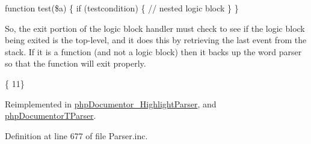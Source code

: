 {\ttfamily  function test(\$a) \{ if (testcondition) \{ // nested logic block \} \} }

\-So, the exit portion of the logic block handler must check to see if the logic block being exited is the top-\/level, and it does this by retrieving the last event from the stack. \-If it is a function (and not a logic block) then it backs up the word parser so that the function will exit properly.

\{ 11\} 

\-Reimplemented in \hyperlink{classphp_documentor___highlight_parser_a74750f3abb8dc11a29a566b51c414370}{php\-Documentor\-\_\-\-Highlight\-Parser}, and \hyperlink{classphp_documentor_t_parser_a74750f3abb8dc11a29a566b51c414370}{php\-Documentor\-T\-Parser}.



\-Definition at line 677 of file \-Parser.\-inc.


